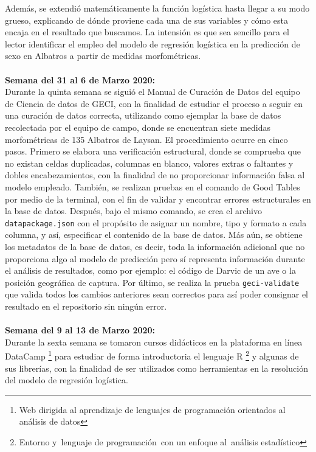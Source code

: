 \documentclass{article}
\begin{document}
    Además, se extendió matemáticamente la función logística hasta llegar a su modo grueso, explicando de dónde proviene cada una de sus variables y cómo esta encaja en el resultado que buscamos. La intensión es que sea sencillo para el lector identificar el empleo del modelo de regresión logística en la predicción de sexo en Albatros a partir de medidas morfométricas. 
    \\ \\
    \textbf{Semana del 31 al 6 de Marzo 2020:} \\
    Durante la quinta semana se siguió el Manual de Curación de Datos del equipo de Ciencia de datos de GECI, con la finalidad de estudiar el proceso a seguir en una curación de datos correcta, utilizando como ejemplar la base de datos recolectada por el equipo de campo, donde se encuentran siete medidas morfométricas de 135 Albatros de Laysan.
    El procedimiento ocurre en cinco pasos. Primero se elabora una verificación estructural, donde se comprueba que no existan celdas duplicadas, columnas en blanco, valores extras o faltantes y dobles encabezamientos, con la finalidad de no proporcionar información falsa al modelo empleado. También, se realizan pruebas en el comando de Good Tables por medio de la terminal, con el fin de validar y encontrar errores estructurales en la base de datos.
    Después, bajo el mismo comando, se crea el archivo \texttt{datapackage.json} con el propósito de asignar un nombre, tipo y formato a cada columna, y así, especificar el contenido de la base de datos. Más aún, se obtiene los metadatos de la base de datos, es decir, toda la información adicional que no proporciona algo al modelo de predicción pero sí representa información durante el análisis de resultados, como por ejemplo: el código de Darvic de un ave o la posición geográfica de captura.
    Por último, se realiza la prueba \texttt{geci-validate} que valida todos los cambios anteriores sean correctos para así poder consignar el resultado en el repositorio sin ningún error. 
    \\ \\
    \textbf{Semana del 9 al 13 de Marzo 2020:} \\
    Durante la sexta semana se tomaron cursos didácticos en la plataforma en línea DataCamp \footnote{Web dirigida al aprendizaje de lenguajes de programación orientados al análisis de datos} para estudiar de forma introductoria el lenguaje R \footnote{Entorno y lenguaje de programación con un enfoque al análisis estadístico} y algunas de sus librerías, con la finalidad de ser utilizados como herramientas en la resolución del modelo de regresión logística.
\end{document}
